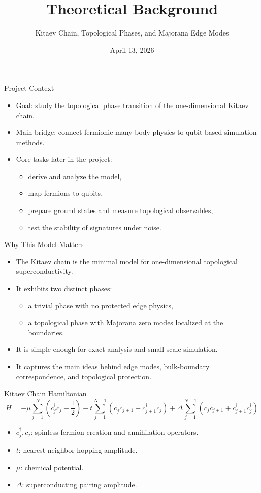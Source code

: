 \documentclass[aspectratio=169]{beamer}
\title{Theoretical Background}
\subtitle{Kitaev Chain, Topological Phases, and Majorana Edge Modes}
\author{}
\date{April 13, 2026}
\begin{document}
\begin{frame}
\titlepage
\end{frame}

\begin{frame}{Project Context}
\begin{itemize}
\item Goal: study the topological phase transition of the one-dimensional Kitaev chain.
\item Main bridge: connect fermionic many-body physics to qubit-based simulation methods.
\item Core tasks later in the project:
\begin{itemize}
\item derive and analyze the model,
\item map fermions to qubits,
\item prepare ground states and measure topological observables,
\item test the stability of signatures under noise.
\end{itemize}
\end{itemize}
\end{frame}

\begin{frame}{Why This Model Matters}
\begin{itemize}
\item The Kitaev chain is the minimal model for one-dimensional topological superconductivity.
\item It exhibits two distinct phases:
\begin{itemize}
\item a trivial phase with no protected edge physics,
\item a topological phase with Majorana zero modes localized at the boundaries.
\end{itemize}
\item It is simple enough for exact analysis and small-scale simulation.
\item It captures the main ideas behind edge modes, bulk-boundary correspondence, and topological protection.
\end{itemize}
\end{frame}

\begin{frame}{Kitaev Chain Hamiltonian}
\[
H =
-\mu \sum_{j=1}^{N} \left(c_j^\dagger c_j - \frac{1}{2}\right)
- t \sum_{j=1}^{N-1} \left(c_j^\dagger c_{j+1} + c_{j+1}^\dagger c_j\right)
+ \Delta \sum_{j=1}^{N-1} \left(c_j c_{j+1} + c_{j+1}^\dagger c_j^\dagger\right)
\]

\begin{itemize}
\item \(c_j^\dagger, c_j\): spinless fermion creation and annihilation operators.
\item \(t\): nearest-neighbor hopping amplitude.
\item \(\mu\): chemical potential.
\item \(\Delta\): superconducting pairing amplitude.
\end{itemize}
\end{frame}
\end{document}
